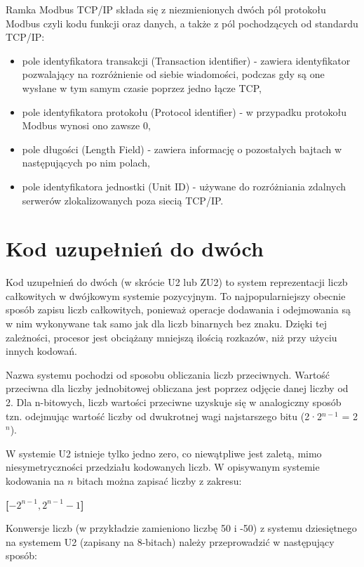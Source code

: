 Ramka Modbus TCP/IP składa się z niezmienionych dwóch pól protokołu Modbus czyli kodu funkcji oraz danych, a także z pól pochodzących od standardu TCP/IP:

\begin{itemize}
	\item pole identyfikatora transakcji (Transaction identifier) - zawiera identyfikator pozwalający na rozróżnienie od siebie wiadomości, podczas gdy są one wysłane w tym samym czasie poprzez jedno łącze TCP,
	\item pole identyfikatora protokołu (Protocol identifier) - w przypadku protokołu Modbus wynosi ono zawsze 0,
	\item  pole długości (Length Field) -  zawiera informację o pozostałych bajtach w następujących po nim polach,
	\item  pole identyfikatora jednostki (Unit ID) - używane do rozróżniania zdalnych serwerów zlokalizowanych poza siecią TCP/IP.
\end{itemize}



\section{Kod uzupełnień do dwóch}

Kod uzupełnień do dwóch (w skrócie U2 lub ZU2) to system reprezentacji liczb całkowitych w dwójkowym systemie pozycyjnym. To najpopularniejszy obecnie sposób zapisu liczb całkowitych, ponieważ operacje dodawania i odejmowania są w nim wykonywane tak samo jak dla liczb binarnych bez znaku. Dzięki tej zależności, procesor jest obciążany mniejszą ilością rozkazów, niż przy użyciu innych kodowań.

Nazwa systemu pochodzi od sposobu obliczania liczb przeciwnych. Wartość przeciwna dla liczby jednobitowej obliczana jest poprzez odjęcie danej liczby od 2. Dla  n-bitowych, liczb wartości przeciwne uzyskuje się w analogiczny sposób tzn. odejmując wartość liczby od dwukrotnej wagi najstarszego bitu (2·2$^{n-1}$ = 2$^n$). 

W systemie U2 istnieje tylko jedno zero, co niewątpliwe jest zaletą, mimo niesymetryczności przedziału kodowanych liczb. W opisywanym systemie kodowania na $n$ bitach można zapisać liczby z zakresu: 

\begin{center}
	\LARGE{\textbf{[$-2^{n-1}, 2^{n-1}-1$]}}
\end{center}


Konwersje liczb (w przykładzie zamieniono liczbę 50 i -50) z systemu dziesiętnego na systemem U2 (zapisany na 8-bitach) należy przeprowadzić w następujący sposób: 


